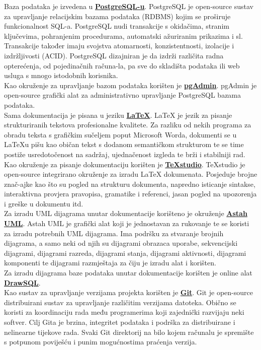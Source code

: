 			Baza podataka je izvedena u \textbf{\href{https://www.postgresql.org/}{PostgreSQL-u}}. PostgreSQL je open-source sustav za upravljanje relacijskim bazama podataka (RDBMS) kojim se proširuje funkcionalnost SQL-a. PostgreSQL nudi transakcije s okidačima, stranim ključevima, pohranjenim procedurama, automatski ažuriranim prikazima i sl. Transakcije također imaju svojstva atomarnosti, konzistentnosti, izolacije i izdržljivosti (ACID). PostgreSQL dizajniran je da izdrži različita radna opterećenja, od pojedinačnih računa-la, pa sve do skladišta podataka ili web usluga s mnogo istodobnih korisnika. \\
			Kao okruženje za upravljanje bazom podataka korišten je \textbf{\href{https://www.pgadmin.org/}{pgAdmin}}. pgAdmin je open-source grafički alat za administrativno upravljanje PostgreSQL bazama podataka.\\
			Sama dokumentacija je pisana u jeziku \textbf{\href{https://www.latex-project.org/}{LaTeX}}. LaTeX je jezik za pisanje strukturiranih tekstova profesionalne kvalitete. Za razliku od nekih programa za obradu teksta s grafičkim sučeljem poput Microsoft Worda, dokumenti se u LaTeXu pišu kao običan tekst s dodanom semantičkom strukturom te se time postiže usredotočenost na sadržaj, ujednačenost izgleda te brži i stabilniji rad.\\
			Kao okruženje za pisanje dokumentaciju korišten je \textbf{\href{https://www.texstudio.org/}{TeXstudio}}. TeXstudio je open-source integrirano okruženje za izradu LaTeX dokumenata. Posjeduje brojne znač-ajke kao što su pogled na strukturu dokumenta, napredno isticanje sintakse, interaktivna provjera pravopisa, gramatike i referenci, jasan pogled na upozorenja i greške u dokumentu itd.\\
			Za izradu UML dijagrama unutar dokumentacije korišteno je okruženje \textbf{\href{https://astah.net/products/astah-uml/}{Astah UML}}. Astah UML je grafički alat koji je jednostavan za rukovanje te se koristi za izradu potrebnih UML dijagrama. Ima podršku za stvaranje brojnih dijagrama, a samo neki od njih su dijagrami obrazaca uporabe, sekvencijski dijagrami, dijagrami razreda, dijagrami stanja, dijagrami aktivnosti, dijagrami komponenti te dijagrami razmještaja za čiju je izradu alat i korišten.\\
			Za izradu dijagrama baze podataka unutar dokumentacije korišten je online alat \textbf{\href{https://drawsql.app/}{DrawSQL}}.\\
			Kao sustav za upravljanje verzijama projekta korišten je \textbf{\href{https://git-scm.com/}{Git}}. Git je open-source distribuirani sustav za upravljanje različitim verzijama datoteka. Obično se koristi za koordinaciju rada među programerima koji zajednički razvijaju neki softver. Cilj Gita je brzina, integritet podataka i podrška za distribuirane i nelinearne tijekove rada. Svaki Git direktorij na bilo kojem računalu je spremište s potpunom poviješću i punim mogućnostima praćenja verzija.\\
